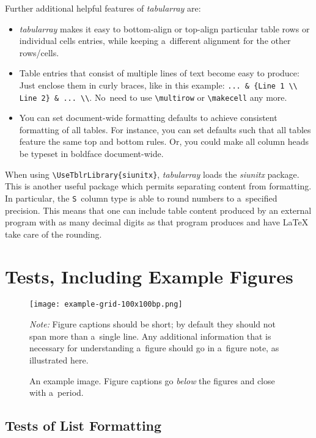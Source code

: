 \documentclass[12pt, a4paper, oneside]{article}
\newlength{\footnotelinespacing}
\newlength{\fsfootnote}
\let \footnotesizeOrig \footnotesize
\renewcommand{\footnotesize}{\footnotesizeOrig\fontsize{\fsfootnote}{\footnotelinespacing}\selectfont}
\renewcommand{\caps}[1]{{\textscale{0.97}{\textls[50]{\MakeUppercase{#1}}}}}
\newenvironment{figurenotes}[1][Note]
	{\par\justifying\medskip\begingroup\footnotesize\noindent\strut\textit{#1:} \ignorespaces}
	{\par\endgroup}
\theoremstyle{Plain}
\theoremstyle{Definition}
\theoremstyle{Remark}
\begin{document}
Further additional helpful features of \mbox{\textit{tabularray}} are:
\begin{itemize}
	\item \mbox{\textit{tabularray}} makes it easy to bottom-align or top-align particular table rows or individual cells entries, while keeping a~different alignment for the other rows\slash cells.
	\item Table entries that consist of multiple lines of text become easy to produce: Just enclose them in curly braces, like in this example: \verb|... & {Line 1 \\ Line 2} & ... \\|. No~need to use \verb|\multirow| or \verb|\makecell| any more.
	\item You can set document-wide formatting defaults to achieve consistent formatting of all tables. For instance, you can set defaults such that all tables feature the same top and bottom rules. Or, you could make all column heads be typeset in boldface document-wide.
\end{itemize}

When using \verb|\UseTblrLibrary{siunitx}|, \mbox{\textit{tabularray}} loads the \mbox{\textit{siunitx}} package. This is another useful package which permits separating content from formatting. In particular, the \verb|S|~column type is able to round numbers to a~specified precision. This means that one can include table content produced by an external program with as many decimal digits as that program produces and have LaTeX take care of the rounding.


\section{Tests, Including Example Figures}
\label{sec:tests}

\begin{figure}
	\texttt{[image: example-grid-100x100bp.png]}%
	\caption{An example \caps{PNG} image. Figure captions go \emph{below} the figures and close with a~period.}
	\label{fig:png}
	\begin{figurenotes}
		Figure captions should be short; by default they should not span more than a~single line. Any additional information that is necessary for understanding a~figure should go in a~figure note, as illustrated here.
	\end{figurenotes}
\end{figure}

\subsection{Tests of List Formatting}
\label{sec:tests:lists}
\end{document}
